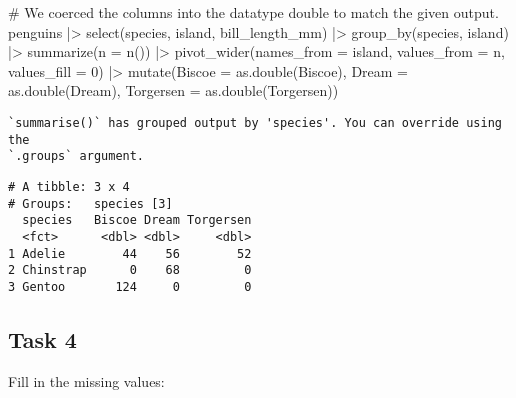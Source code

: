 \documentclass[
  letterpaper,
  DIV=11,
  numbers=noendperiod]{scrartcl}
\newenvironment{Shaded}{\begin{snugshade}}{\end{snugshade}}
\newcommand{\AttributeTok}[1]{\textcolor[rgb]{0.40,0.45,0.13}{#1}}
\newcommand{\CommentTok}[1]{\textcolor[rgb]{0.37,0.37,0.37}{#1}}
\newcommand{\DecValTok}[1]{\textcolor[rgb]{0.68,0.00,0.00}{#1}}
\newcommand{\FunctionTok}[1]{\textcolor[rgb]{0.28,0.35,0.67}{#1}}
\newcommand{\NormalTok}[1]{\textcolor[rgb]{0.00,0.23,0.31}{#1}}
\newcommand{\SpecialCharTok}[1]{\textcolor[rgb]{0.37,0.37,0.37}{#1}}
\begin{document}
\begin{Shaded}
\begin{Highlighting}[]
\CommentTok{\# We coerced the columns into the datatype double to match the given output.}
\NormalTok{penguins }\SpecialCharTok{|\textgreater{}}
  \FunctionTok{select}\NormalTok{(species, island, bill\_length\_mm) }\SpecialCharTok{|\textgreater{}} 
  \FunctionTok{group\_by}\NormalTok{(species, island) }\SpecialCharTok{|\textgreater{}} 
  \FunctionTok{summarize}\NormalTok{(}\AttributeTok{n =} \FunctionTok{n}\NormalTok{()) }\SpecialCharTok{|\textgreater{}} 
  \FunctionTok{pivot\_wider}\NormalTok{(}\AttributeTok{names\_from =}\NormalTok{ island, }\AttributeTok{values\_from =}\NormalTok{ n, }
              \AttributeTok{values\_fill =} \DecValTok{0}\NormalTok{) }\SpecialCharTok{|\textgreater{}} \FunctionTok{mutate}\NormalTok{(}\AttributeTok{Biscoe =} \FunctionTok{as.double}\NormalTok{(Biscoe),}
                                         \AttributeTok{Dream =} \FunctionTok{as.double}\NormalTok{(Dream),}
                                         \AttributeTok{Torgersen =} \FunctionTok{as.double}\NormalTok{(Torgersen))}
\end{Highlighting}
\end{Shaded}

\begin{verbatim}
`summarise()` has grouped output by 'species'. You can override using the
`.groups` argument.
\end{verbatim}

\begin{verbatim}
# A tibble: 3 x 4
# Groups:   species [3]
  species   Biscoe Dream Torgersen
  <fct>      <dbl> <dbl>     <dbl>
1 Adelie        44    56        52
2 Chinstrap      0    68         0
3 Gentoo       124     0         0
\end{verbatim}

\subsection{Task 4}\label{task-4}

Fill in the missing values:
\end{document}

